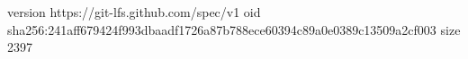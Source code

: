 version https://git-lfs.github.com/spec/v1
oid sha256:241aff679424f993dbaadf1726a87b788ece60394c89a0e0389c13509a2cf003
size 2397
